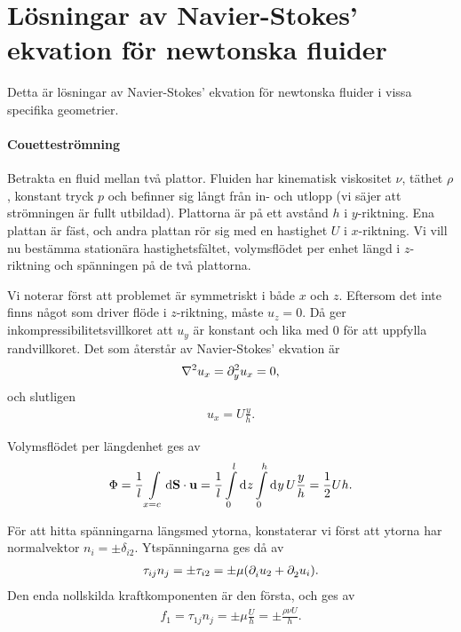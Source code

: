 \section{Lösningar av Navier-Stokes' ekvation för newtonska fluider}

Detta är lösningar av Navier-Stokes' ekvation för newtonska fluider i vissa specifika geometrier.

\paragraph{Couetteströmning}
Betrakta en fluid mellan två plattor. Fluiden har kinematisk viskositet $\nu$, täthet $\rho$, konstant tryck $p$ och befinner sig långt från in- och utlopp (vi säjer att strömningen är fullt utbildad). Plattorna är på ett avstånd $h$ i $y$-riktning. Ena plattan är fäst, och andra plattan rör sig med en hastighet $U$ i $x$-riktning. Vi vill nu bestämma stationära hastighetsfältet, volymsflödet per enhet längd i $z$-riktning och spänningen på de två plattorna.

Vi noterar först att problemet är symmetriskt i både $x$ och $z$. Eftersom det inte finns något som driver flöde i $z$-riktning, måste $u_{z} = 0$. Då ger inkompressibilitetsvillkoret att $u_{y}$ är konstant och lika med $0$ för att uppfylla randvillkoret. Det som återstår av Navier-Stokes' ekvation är
\begin{align*}
	\laplacian{u_{x}} = \del[2]{y}{u_{x}} = 0,
\end{align*}
och slutligen
\begin{align*}
	u_{x} = U\frac{y}{h}.
\end{align*}

Volymsflödet per längdenhet ges av
\begin{align*}
	\Phi = \frac{1}{l}\int\limits_{x = c}^{}\dd{\vb{S}}\cdot \vb{u} = \frac{1}{l}\int\limits_{0}^{l}\dd[]{z}\int\limits_{0}^{h}\dd[]{y}U\frac{y}{h} = \frac{1}{2}Uh.
\end{align*}

För att hitta spänningarna längsmed ytorna, konstaterar vi först att ytorna har normalvektor $n_{i} = \pm\delta_{i2}$. Ytspänningarna ges då av
\begin{align*}
	\tau_{ij}n_{j} = \pm\tau_{i2} = \pm\mu(\partial_{i}^{}u_{2} + \partial_{2}^{}u_{i}).
\end{align*}
Den enda nollskilda kraftkomponenten är den första, och ges av
\begin{align*}
	f_{1} = \tau_{1j}n_{j} = \pm\mu\frac{U}{h} = \pm\frac{\rho\nu U}{h}.
\end{align*}

